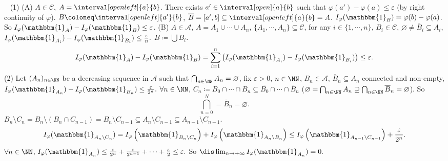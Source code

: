 \begin{proofenv}
    \ \newline
    (1) \newline
    (A) $A\in \mathcal{C}$, $A=\interval[open left]{a}{b}$. There exists $a'\in \interval[open]{a}{b}$ such that $\varphi(a')-\varphi(a)\le \varepsilon$ (by right continuity of $\varphi$).
    $B\coloneq \interval[open left]{a'}{b}$, $\overline{B}=[a',b]\subseteq \interval[open left]{a}{b}=A$. $I_\varphi(\mathbbm{1}_B)=\varphi(b)-\varphi(a)$. So $I_\varphi(\mathbbm{1}_A)-I_\varphi(\mathbbm{1}_B)\le \varepsilon$.
    \newline
    (B)
    $A\in \mathcal{A}$, $A=A_1\cup\cdots\cup A_n$, $\{A_1,\cdots,A_n\}\subseteq\mathcal{C}$, for any $i\in\{1,\cdots,n\}$, $B_i\in \mathcal{C}$, $\varnothing\neq \overline{B}_i\subseteq A_i$, $I_\varphi(\mathbbm{1}_{A_i})-I_\varphi(\mathbbm{1}_{B_i})\le \frac{\varepsilon}{n}.$ $B\coloneq \bigcup B_i$.
    $$ I_\varphi (\mathbbm{1}_A)-I_\varphi(\mathbbm{1}_B)=\sum_{i=1}^{n}\left(I_\varphi(\mathbbm{1}_{A_i})-I_\varphi(\mathbbm{1}_{B_i})\right)\le \varepsilon.$$
    (2) Let $(A_n)_{n\in\NN}$ be a decreasing sequence in $\mathcal{A}$ such that $\bigcap_{n\in\NN}A_n=\varnothing$, fix $\varepsilon>0$, $n\in\NN$, $B_n\in\mathcal{A}$,
    $\overline{B}_n\subseteq A_n$ connected and non-empty, $I_\varphi(\mathbbm{1}_{A_n})-I_\varphi(\mathbbm{1}_{B_n})\le \frac{\varepsilon}{2^n}.$ $\forall n\in\NN$, $C_n\coloneq B_0 \cap \cdots \cap B_n\subseteq\overline{B_0}\cap \cdots \cap \overline{B}_n$ ($\varnothing=\bigcap_{n\in\NN} A_n\supseteq \bigcap_{n\in\NN}\overline{B}_n=\varnothing$). 
    So 
    $$ \bigcap_{n=0}^{N}=\overline{B}_n=\varnothing.$$
    $ B_n\setminus C_n=B_n\setminus \left(B_n\cap C_{n-1}\right)=B_n\setminus C_{n-1}\subseteq A_n\setminus C_{n-1}\subseteq A_{n-1}\setminus C_{n-1}$.
    $$ I_\varphi(\mathbbm{1}_{A_n\setminus C_n})=I_\varphi\left(\mathbbm{1}_{B_n\setminus C_n}\right)+I_\varphi\left(\mathbbm{1}_{A_n\setminus B_n}\right)\le I_\varphi\left(\mathbbm{1}_{A_{n-1}\setminus C_{n-1}}\right)+\frac{\varepsilon}{2^n}.$$
    $\forall n\in \NN$, $I_\varphi(\mathbbm{1}_{A_n})\le \frac{\varepsilon}{2^n}+\frac{\varepsilon}{2^{n-1}}+\cdots+\frac{\varepsilon}{2}\le \varepsilon.$
    So $\dis \lim_{n\rightarrow +\infty}I_\varphi(\mathbbm{1}_{A_n})=0.$
\end{proofenv}

